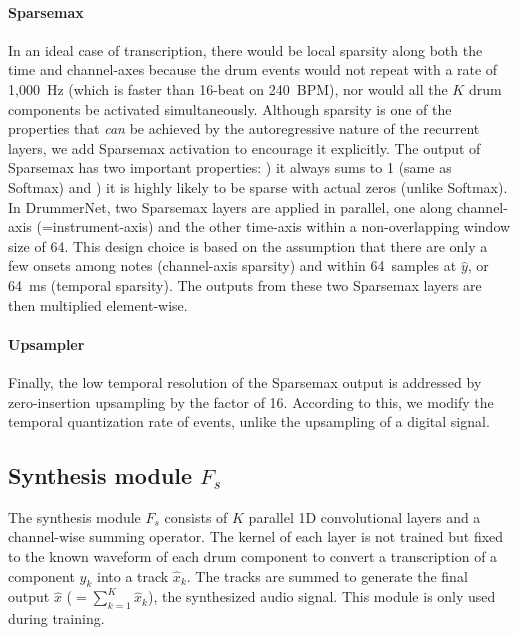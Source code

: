 \documentclass{article}
\newcommand{\largesqueeze}{\vspace{-0.2cm}}
\begin{document}
	\paragraph{Sparsemax}
	
	In an ideal case of transcription, there would be local sparsity along both the time and channel-axes because the drum events would not repeat with a rate of 1,000~Hz (which is faster than 16-beat on 240~BPM), nor would all the $K$ drum components be activated simultaneously. Although sparsity is one of the properties that \textit{can} be achieved by the autoregressive nature of the recurrent layers, we add Sparsemax \cite{martins2016softmax} activation to encourage it explicitly. The output of Sparsemax has two important properties:  ) it always sums to 1 (same as Softmax) and ) it is highly likely to be sparse with actual zeros (unlike Softmax). In DrummerNet, two Sparsemax layers are applied in parallel, one along channel-axis (=instrument-axis) and the other time-axis within a non-overlapping window size of 64. This design choice is based on the assumption that there are only a few onsets among notes (channel-axis sparsity) and within 64~samples at $\hat{y}$, or 64~ms (temporal sparsity). The outputs from these two Sparsemax layers are then multiplied element-wise. 
	
	\largesqueeze
	\paragraph{Upsampler} 
	
	Finally, the low temporal resolution of the Sparsemax output is addressed by zero-insertion upsampling by the factor of 16. According to this, we modify the temporal quantization rate of events, unlike the upsampling of a digital signal.
	
	\subsection{Synthesis module $F_s$}
	\color{black}
	
	The synthesis module $F_{s}$ consists of $K$ parallel 1D convolutional layers and a channel-wise summing operator. The kernel of each layer is not trained but fixed to the known waveform of each drum component to convert a transcription of a component $\hat{y}_k$ into a track $\hat{x}_k$. The tracks are summed to generate the final output $\hat{x}$ ($=\sum_{k=1}^{K} \hat{x}_k$), the synthesized audio signal. This module is only used during training.
	
\end{document}
